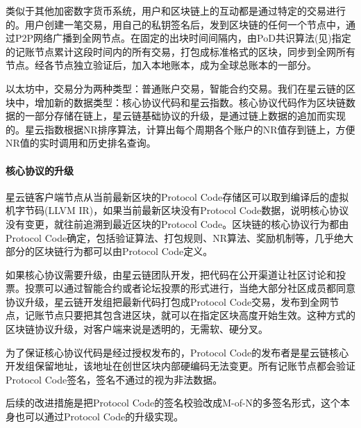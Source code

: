 类似于其他加密数字货币系统，用户和区块链上的互动都是通过特定的交易进行的。用户创建一笔交易，用自己的私钥签名后，发到区块链的任何一个节点中，通过P2P网络广播到全网节点。在固定的出块时间间隔内，由PoD共识算法(见)指定的记账节点累计这段时间内的所有交易，打包成标准格式的区块，同步到全网所有节点。经各节点独立验证后，加入本地账本，成为全球总账本的一部分。

以太坊中，交易分为两种类型：普通账户交易，智能合约交易。我们在星云链的区块中，增加新的数据类型：核心协议代码和星云指数。核心协议代码作为区块链数据的一部分存储在链上，星云链基础协议的升级，是通过链上数据的追加而实现的。星云指数根据NR排序算法，计算出每个周期各个账户的NR值存到链上，方便NR值的实时调用和历史排名查询。

\paragraph{核心协议的升级}

星云链客户端节点从当前最新区块的Protocol Code存储区可以取到编译后的虚拟机字节码(LLVM IR)，如果当前最新区块没有Protocol Code数据，说明核心协议没有变更，就往前追溯到最近区块的Protocol Code。区块链的核心协议行为都由Protocol Code确定，包括验证算法、打包规则、NR算法、奖励机制等，几乎绝大部分的区块链行为都可以由Protocol Code定义。

如果核心协议需要升级，由星云链团队开发，把代码在公开渠道让社区讨论和投票。投票可以通过智能合约或者论坛投票的形式进行，当绝大部分社区成员都同意协议升级，星云链开发组把最新代码打包成Protocol Code交易，发布到全网节点，记账节点只要把其包含进区块，就可以在指定区块高度开始生效。这种方式的区块链协议升级，对客户端来说是透明的，无需软、硬分叉。

为了保证核心协议代码是经过授权发布的，Protocol Code的发布者是星云链核心开发组保留地址，该地址在创世区块内部硬编码无法变更。所有记账节点都会验证Protocol Code签名，签名不通过的视为非法数据。

后续的改进措施是把Protocol Code的签名校验改成M-of-N的多签名形式，这个本身也可以通过Protocol Code的升级实现。
